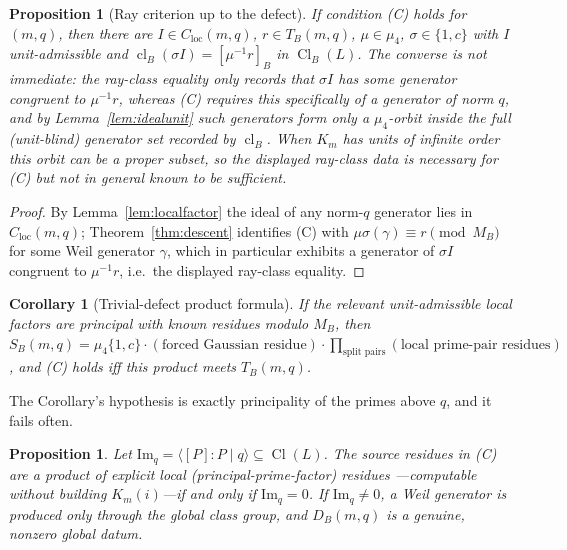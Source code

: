 \documentclass[11pt]{article}
\theoremstyle{plain}
\newtheorem{proposition}[theorem]{Proposition}
\newtheorem{corollary}[theorem]{Corollary}
\theoremstyle{definition}
\theoremstyle{remark}
\newcommand{\Cl}{\operatorname{Cl}}
\begin{document}
\begin{proposition}[Ray criterion up to the defect]\label{prop:fieldfree}
If condition (C) holds for $(m,q)$, then there are $I\in C_{\mathrm{loc}}(m,q)$,
$r\in T_B(m,q)$, $\mu\in\mu_4$, $\sigma\in\{1,c\}$ with $I$ unit-admissible and
$\operatorname{cl}_B(\sigma I)=[\mu^{-1}r]_B$ in $\Cl_B(L)$. The converse is not
immediate: the ray-class equality only records that $\sigma I$ has \emph{some}
generator congruent to $\mu^{-1}r$, whereas (C) requires this specifically of a
generator of norm $q$, and by Lemma~\ref{lem:idealunit} such generators form only
a $\mu_4$-orbit inside the full (unit-blind) generator set recorded by
$\operatorname{cl}_B$. When $K_m$ has units of infinite order this orbit can be
a proper subset, so the displayed ray-class data is necessary for (C) but not
in general known to be sufficient.
\end{proposition}

\begin{proof}
By Lemma~\ref{lem:localfactor} the ideal of any norm-$q$ generator lies in
$C_{\mathrm{loc}}(m,q)$; Theorem~\ref{thm:descent} identifies (C) with
$\mu\sigma(\gamma)\equiv r\pmod{M_B}$ for some Weil generator $\gamma$, which in
particular exhibits a generator of $\sigma I$ congruent to $\mu^{-1}r$, i.e.\ the
displayed ray-class equality.
\end{proof}

\begin{corollary}[Trivial-defect product formula]\label{cor:trivialdefect}
If the relevant unit-admissible local factors are principal with known residues
modulo $M_B$, then $S_B(m,q)=\mu_4\{1,c\}\cdot(\text{forced Gaussian residue})
\cdot\prod_{\text{split pairs}}(\text{local prime-pair residues})$, and (C) holds
iff this product meets $T_B(m,q)$.
\end{corollary}

The Corollary's hypothesis is exactly principality of the primes above $q$, and
it fails often.

\begin{proposition}\label{prop:imq}
Let $\mathrm{Im}_q=\langle[P]:P\mid q\rangle\subseteq\Cl(L)$. The source residues
in \emph{(C)} are a product of explicit local (principal-prime-factor) residues
---computable without building $K_m(i)$---if and only if $\mathrm{Im}_q=0$. If
$\mathrm{Im}_q\ne0$, a Weil generator is produced only through the global class
group, and $D_B(m,q)$ is a genuine, nonzero global datum.
\end{proposition}
\end{document}
